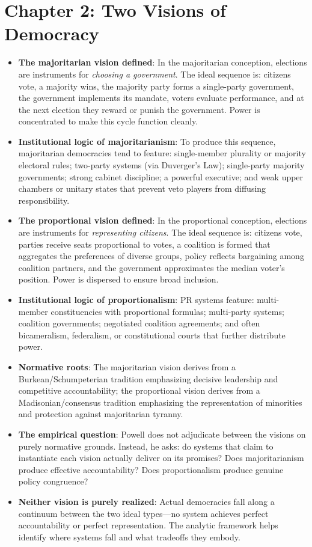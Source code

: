 \documentclass[12pt]{article}
\begin{document}
\section{Chapter 2: Two Visions of Democracy}

\begin{itemize}[leftmargin=*, itemsep=4pt]
    \item \textbf{The majoritarian vision defined}: In the majoritarian conception, elections are instruments for \emph{choosing a government}. The ideal sequence is: citizens vote, a majority wins, the majority party forms a single-party government, the government implements its mandate, voters evaluate performance, and at the next election they reward or punish the government. Power is concentrated to make this cycle function cleanly.
    \item \textbf{Institutional logic of majoritarianism}: To produce this sequence, majoritarian democracies tend to feature: single-member plurality or majority electoral rules; two-party systems (via Duverger's Law); single-party majority governments; strong cabinet discipline; a powerful executive; and weak upper chambers or unitary states that prevent veto players from diffusing responsibility.
    \item \textbf{The proportional vision defined}: In the proportional conception, elections are instruments for \emph{representing citizens}. The ideal sequence is: citizens vote, parties receive seats proportional to votes, a coalition is formed that aggregates the preferences of diverse groups, policy reflects bargaining among coalition partners, and the government approximates the median voter's position. Power is dispersed to ensure broad inclusion.
    \item \textbf{Institutional logic of proportionalism}: PR systems feature: multi-member constituencies with proportional formulas; multi-party systems; coalition governments; negotiated coalition agreements; and often bicameralism, federalism, or constitutional courts that further distribute power.
    \item \textbf{Normative roots}: The majoritarian vision derives from a Burkean/Schumpeterian tradition emphasizing decisive leadership and competitive accountability; the proportional vision derives from a Madisonian/consensus tradition emphasizing the representation of minorities and protection against majoritarian tyranny.
    \item \textbf{The empirical question}: Powell does not adjudicate between the visions on purely normative grounds. Instead, he asks: do systems that claim to instantiate each vision actually deliver on its promises? Does majoritarianism produce effective accountability? Does proportionalism produce genuine policy congruence?
    \item \textbf{Neither vision is purely realized}: Actual democracies fall along a continuum between the two ideal types---no system achieves perfect accountability or perfect representation. The analytic framework helps identify where systems fall and what tradeoffs they embody.
\end{itemize}
\end{document}
